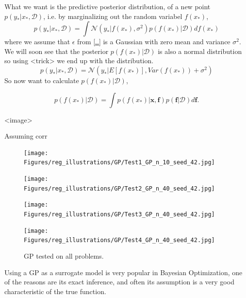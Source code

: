 What we want is the predictive posterior distribution, of a new point $p(y_*|x_*, \mathcal{D})$, i.e. by marginalizing 
out the random variabel $f(x_*)$, 
\begin{equation}\label{GP_predictive}
    p(y_*|x_*,\mathcal{D}) = \int \mathcal{N}(y_*|f(x_*), \sigma^2) p(f(x_*)|\mathcal{D})df(x_*)
\end{equation}
where we assume that $\epsilon$ from \ref{..} is a Gaussian with zero mean and variance $\sigma^2$. We will
soon see that the posterior $p(f(x_*)|\mathcal{D})$ is also a normal distribution so using <trick> we end up
with the distribution. 
$$p(y_*|x_*,\mathcal{D}) = \mathcal{N}(y_*|E[f(x_*)], Var(f(x_*))+\sigma^2)$$
So now want to calculate $p(f(x_*)|\mathcal{D})$, 

\begin{equation}\label{posterior_function2}
    p(f(x_*)|\mathcal{D})= \int p(f(x_*)|\textbf{x}, \textbf{f})p(\textbf{f}|\mathcal{D})d\textbf{f}.
\end{equation} 

<image>

Assuming corr

\begin{figure}[h]
    \centering
    \begin{minipage}[b]{0.49\textwidth}
     \texttt{[image: Figures/reg\_illustrations/GP/Test1\_GP\_n\_10\_seed\_42.jpg]}
    \end{minipage}
    \hfill
    \begin{minipage}[b]{0.49\textwidth}
      \texttt{[image: Figures/reg\_illustrations/GP/Test2\_GP\_n\_40\_seed\_42.jpg]}
     \end{minipage}
    
     \begin{minipage}[b]{0.49\textwidth}
      \texttt{[image: Figures/reg\_illustrations/GP/Test3\_GP\_n\_40\_seed\_42.jpg]}
     \end{minipage}
     \hfill
     \begin{minipage}[b]{0.49\textwidth}
       \texttt{[image: Figures/reg\_illustrations/GP/Test4\_GP\_n\_40\_seed\_42.jpg]}
      \end{minipage}
      \caption{GP tested on all problems.}
\end{figure}

Using a GP as a surrogate model is very popular in Bayesian Optimization, one of the reasons
are its exact inference, and often its assumption is a very good characteristic of the true
function. 

